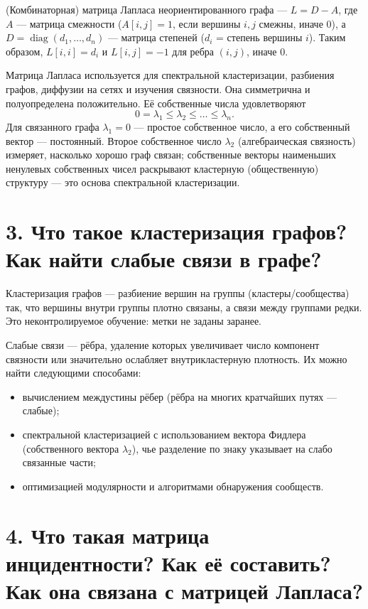 \documentclass[12pt,a4paper]{article}
\begin{document}
(Комбинаторная) матрица Лапласа неориентированного графа --- $L=D-A$, где $A$ --- матрица смежности ($A[i,j]=1$, если вершины $i,j$ смежны, иначе $0$), а $D=\operatorname{diag}(d_1,\dots,d_n)$ --- матрица степеней ($d_i$ = степень вершины $i$). Таким образом, $L[i,i]=d_i$ и $L[i,j]=-1$ для ребра $(i,j)$, иначе $0$.

Матрица Лапласа используется для спектральной кластеризации, разбиения графов, диффузии на сетях и изучения связности. Она симметрична и полуопределена положительно. Её собственные числа удовлетворяют
\[
0=\lambda_1\le\lambda_2\le\dots\le\lambda_n.
\]
Для связанного графа $\lambda_1=0$ --- простое собственное число, а его собственный вектор --- постоянный. Второе собственное число $\lambda_2$ (алгебраическая связность) измеряет, насколько хорошо граф связан; собственные векторы наименьших ненулевых собственных чисел раскрывают кластерную (общественную) структуру --- это основа спектральной кластеризации.

\section*{3. Что такое кластеризация графов? Как найти слабые связи в графе?}

Кластеризация графов --- разбиение вершин на группы (кластеры/сообщества) так, что вершины внутри группы плотно связаны, а связи между группами редки. Это неконтролируемое обучение: метки не заданы заранее.

Слабые связи --- рёбра, удаление которых увеличивает число компонент связности или значительно ослабляет внутрикластерную плотность. Их можно найти следующими способами:
\begin{itemize}
    \item вычислением междустины рёбер (рёбра на многих кратчайших путях --- слабые);
    \item спектральной кластеризацией с использованием вектора Фидлера (собственного вектора $\lambda_2$), чье разделение по знаку указывает на слабо связанные части;
    \item оптимизацией модулярности и алгоритмами обнаружения сообществ.
\end{itemize}

\section*{4. Что такая матрица инцидентности? Как её составить? Как она связана с матрицей Лапласа?}
\end{document}

